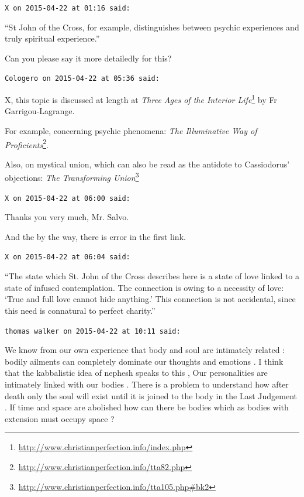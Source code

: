 \begin{footnotesize}
\begin{sffamily}
\texttt{X on 2015-04-22 at 01:16 said:}

``St John of the Cross, for example, distinguishes between psychic experiences and truly spiritual experience.''

Can you please say it more detailedly for this?

\hfill

\texttt{Cologero on 2015-04-22 at 05:36 said:}

X, this topic is discussed at length at
\textit{Three Ages of the Interior Life}\footnote{\url{http://www.christianperfection.info/index.php}} by Fr Garrigou-Lagrange.

For example, concerning psychic phenomena: \textit{The Illuminative Way of Proficients}\footnote{\url{http://www.christianperfection.info/tta82.php}}.

Also, on mystical union, which can also be read as the antidote to Cassiodorus' objections: \textit{The Transforming Union}\footnote{\url{http://www.christianperfection.info/tta105.php\#bk2}}

\hfill

\texttt{X on 2015-04-22 at 06:00 said:}

Thanks you very much, Mr. Salvo.

And the by the way, there is error in the first link.

\hfill

\texttt{X on 2015-04-22 at 06:04 said:}

``The state which St. John of the Cross describes here is a state of love linked to a state of infused contemplation. The connection is owing to a necessity of love: `True and full love cannot hide anything.' This connection is not accidental, since this need is connatural to perfect charity.''

\hfill

\texttt{thomas walker on 2015-04-22 at 10:11 said:}

We know from our own experience that body and soul are intimately related : bodily ailments can completely dominate our thoughts and emotions . I think that the kabbalistic idea of nephesh speaks to this , Our personalities are intimately linked with our bodies . There is a problem to understand how after death only the soul will exist until it is joined to the body in the Last Judgement . If time and space are abolished how can there be bodies which as bodies with extension must occupy space ?


\end{sffamily}
\end{footnotesize}
